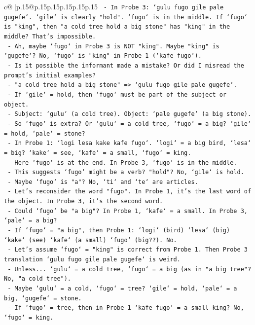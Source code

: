 \documentclass{article}
\begin{document}
{\begin{supertabular}{c@{$\;$}|p{.15\linewidth}@{}p{.15\linewidth}p{.15\linewidth}p{.15\linewidth}p{.15\linewidth}p{.15\linewidth}}
{{{\texttt{  {-} In Probe 3: `gulu fugo gile pale gugefe`. `gile` is clearly "hold". `fugo` is in the middle. If `fugo` is "king", then "a cold tree hold a big stone" has "king" in the middle? That's impossible.} \\
\texttt{  {-} Ah, maybe `fugo` in Probe 3 is NOT "king". Maybe "king" is `gugefe`? No, `fugo` is "king" in Probe 1 (`kafe fugo`).} \\
\texttt{  {-} Is it possible the informant made a mistake? Or did I misread the prompt's initial examples?} \\
\texttt{  {-} "a cold tree hold a big stone" => `gulu fugo gile pale gugefe`.} \\
\texttt{  {-} If `gile` = hold, then `fugo` must be part of the subject or object.} \\
\texttt{  {-} Subject: `gulu` (a cold tree). Object: `pale gugefe` (a big stone).} \\
\texttt{  {-} So `fugo` is extra? Or `gulu` = a cold tree, `fugo` = a big? `gile` = hold, `pale` = stone?} \\
\texttt{  {-} In Probe 1: `logi lesa kake kafe fugo`. `logi` = a big bird, `lesa` = big? `kake` = see, `kafe` = a small, `fugo` = king.} \\
\texttt{  {-} Here `fugo` is at the end. In Probe 3, `fugo` is in the middle.} \\
\texttt{  {-} This suggests `fugo` might be a verb? "hold"? No, `gile` is hold.} \\
\texttt{  {-} Maybe `fugo` is "a"? No, `ti` and `te` are articles.} \\
\texttt{  {-} Let's reconsider the word "fugo". In Probe 1, it's the last word of the object. In Probe 3, it's the second word.} \\
\texttt{  {-} Could `fugo` be "a big"? In Probe 1, `kafe` = a small. In Probe 3, `pale` = a big?} \\
\texttt{  {-} If `fugo` = "a big", then Probe 1: `logi` (bird) `lesa` (big) `kake` (see) `kafe` (a small) `fugo` (big??). No.} \\
\texttt{  {-} Let's assume `fugo` = "king" is correct from Probe 1. Then Probe 3 translation `gulu fugo gile pale gugefe` is weird.} \\
\texttt{  {-} Unless... `gulu` = a cold tree, `fugo` = a big (as in "a big tree"? No, "a cold tree").} \\
\texttt{  {-} Maybe `gulu` = a cold, `fugo` = tree? `gile` = hold, `pale` = a big, `gugefe` = stone.} \\
\texttt{  {-} If `fugo` = tree, then in Probe 1 `kafe fugo` = a small king? No, `fugo` = king.} \\
}}}
\end{supertabular}}
\end{document}
